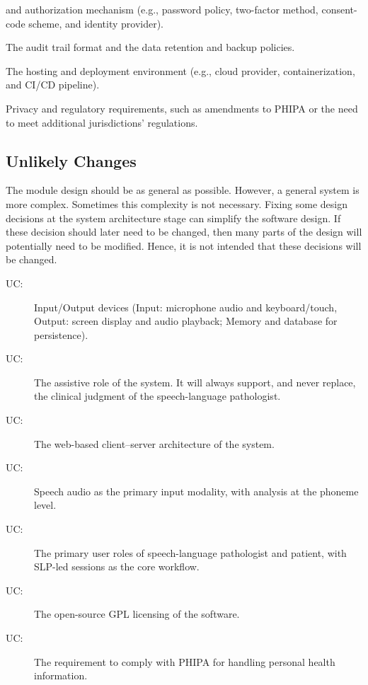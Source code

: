 \documentclass[12pt, titlepage]{article}
\newcounter{acnum}
\newcommand{\actheacnum}{AC\theacnum}
\newcounter{ucnum}
\newcommand{\uctheucnum}{UC\theucnum}
\begin{document}
\begin{description}
  and authorization mechanism (e.g., password policy, two-factor method,
  consent-code scheme, and identity provider).
\item[\refstepcounter{acnum} \actheacnum \label{acAudit}:] The audit trail
  format and the data retention and backup policies.
\item[\refstepcounter{acnum} \actheacnum \label{acDeploy}:] The hosting and
  deployment environment (e.g., cloud provider, containerization, and
  CI/CD pipeline).
\item[\refstepcounter{acnum} \actheacnum \label{acPrivacy}:] Privacy and
  regulatory requirements, such as amendments to PHIPA or the need to meet
  additional jurisdictions' regulations.
\end{description}

\subsection{Unlikely Changes} \label{SecUchange}

The module design should be as general as possible. However, a general system is
more complex. Sometimes this complexity is not necessary. Fixing some design
decisions at the system architecture stage can simplify the software design. If
these decision should later need to be changed, then many parts of the design
will potentially need to be modified. Hence, it is not intended that these
decisions will be changed.

\begin{description}
\item[ \uctheucnum \label{ucIO}:] Input/Output devices
  (Input: microphone audio and keyboard/touch, Output: screen display and
  audio playback; Memory and database for persistence).
\item[ \uctheucnum \label{ucAssistive}:] The assistive
  role of the system. It will always support, and never replace, the clinical
  judgment of the speech-language pathologist.
\item[ \uctheucnum \label{ucArch}:] The web-based
  client--server architecture of the system.
\item[ \uctheucnum \label{ucAudioModality}:] Speech audio
  as the primary input modality, with analysis at the phoneme level.
\item[ \uctheucnum \label{ucUsers}:] The primary user
  roles of speech-language pathologist and patient, with SLP-led sessions as
  the core workflow.
\item[ \uctheucnum \label{ucLicense}:] The open-source
  GPL licensing of the software.
\item[ \uctheucnum \label{ucPHIPA}:] The requirement to
  comply with PHIPA for handling personal health information.
\end{description}
\end{document}
